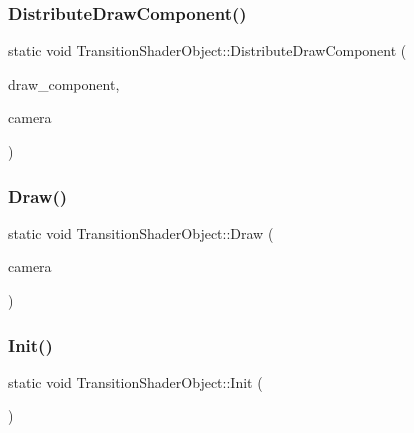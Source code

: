\subsubsection{\texorpdfstring{Distribute\+Draw\+Component()}{DistributeDrawComponent()}}
{\footnotesize\ttfamily static void Transition\+Shader\+Object\+::\+Distribute\+Draw\+Component (\begin{DoxyParamCaption}\item[{\mbox{\hyperlink{class_draw_component}{Draw\+Component}} $\ast$}]{draw\+\_\+component,  }\item[{\mbox{\hyperlink{class_camera}{Camera}} $\ast$}]{camera }\end{DoxyParamCaption})\hspace{0.3cm}{\ttfamily [static]}}

\mbox{\label{class_transition_shader_object_a874f52921658716416f604e1ae89593f}} 
\subsubsection{\texorpdfstring{Draw()}{Draw()}}
{\footnotesize\ttfamily static void Transition\+Shader\+Object\+::\+Draw (\begin{DoxyParamCaption}\item[{\mbox{\hyperlink{class_camera}{Camera}} $\ast$}]{camera }\end{DoxyParamCaption})\hspace{0.3cm}{\ttfamily [static]}}

\mbox{\label{class_transition_shader_object_a97878416bcc6fcc45b762efc1a5b0f14}} 
\subsubsection{\texorpdfstring{Init()}{Init()}}
{\footnotesize\ttfamily static void Transition\+Shader\+Object\+::\+Init (\begin{DoxyParamCaption}{ }\end{DoxyParamCaption})\hspace{0.3cm}{\ttfamily [static]}}

